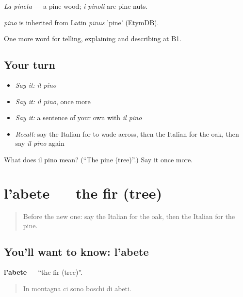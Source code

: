 \emph{La pineta} — a pine wood; \emph{i pinoli} are pine nuts.

\begin{cousinweb}
\emph{pino} is inherited from Latin \emph{pīnus} 'pine' (EtymDB).
\end{cousinweb}

\begin{grammarlens}[title={What you've built}]
One more word for telling, explaining and describing at B1.
\end{grammarlens}

\subsection*{Your turn}
\begin{itemize}
\raggedright
  \item \emph{Say it:} \emph{il pino}
  \item \emph{Say it:} \emph{il pino}, once more
  \item \emph{Say it:} a sentence of your own with \emph{il pino}
  \item \emph{Recall:} say the Italian for to wade across, then the Italian for the oak, then say \emph{il pino} again
\end{itemize}

\begin{tcolorbox}[breakable,colback=teal!4,colframe=teal!35!black,title={Before you move on}]
What does il pino mean? (\textquotedblleft{}The pine (tree)\textquotedblright{}.) Say it once more.
\end{tcolorbox}
\section[l'abete]{l'abete — the fir (tree)}

\label{lesson:IT-C461-abete}



\begin{quote}
Before the new one: say the Italian for the oak, then the Italian for the pine.
\end{quote}

\subsection*{You'll want to know: l'abete}
\textbf{l'abete} — \textquotedblleft{}the fir (tree)\textquotedblright{}.

\begin{quote}
In montagna ci sono boschi di abeti.
\end{quote}

